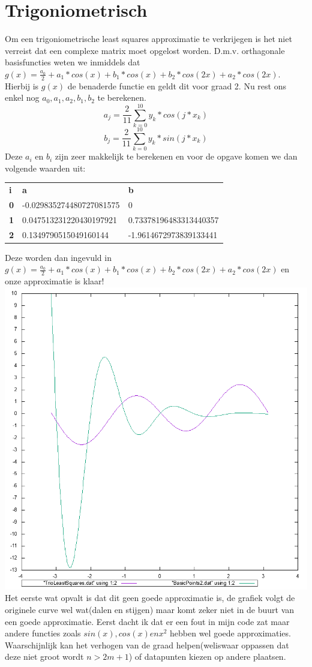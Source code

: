 \documentclass[10pt,a4paper]{article}
\begin{document}
\section{Trigoniometrisch}
Om een trigoniometrische least squares approximatie te verkrijegen is het niet verreist dat een complexe matrix moet opgelost worden. D.m.v. orthagonale basisfuncties weten we inmiddels dat $g(x) = \frac{a_{0}}{2}+a_{1}*cos(x)+b_{1}*cos(x)+b_{2}*cos(2x)+a_{2}*cos(2x)$. Hierbij is $g(x)$ de benaderde functie en geldt dit voor graad 2. Nu rest ons enkel nog $a_{0}, a_{1}, a_{2}, b_{1}, b_{2}$ te berekenen.
$$a_{j} =  \frac{2}{11}\sum_{k = 0}^{10}y_{k}*cos(j*x_{k})$$
$$b_{j} =  \frac{2}{11}\sum_{k = 0}^{10}y_{k}*sin(j*x_{k})$$
Deze $a_{i}$ en $b_{i}$ zijn zeer makkelijk te berekenen en voor de opgave komen we dan volgende waarden uit:
\newline
\begin{tabular}{lll}
\textbf{i} & \textbf{a}               & \textbf{b}             \\
\textbf{0} & -0.029835274480727081575 & 0                      \\
\textbf{1} & 0.047513231220430197921  & 0.73378196483313440357 \\
\textbf{2} & 0.1349790515049160144    & -1.9614672973839133441
\end{tabular}
Deze worden dan ingevuld in $g(x) = \frac{a_{0}}{2}+a_{1}*cos(x)+b_{1}*cos(x)+b_{2}*cos(2x)+a_{2}*cos(2x)$ en onze approximatie is klaar!
\newline
\includegraphics[scale=0.7]{TrioLeastSquares}
Het eerste wat opvalt is dat dit geen goede approximatie is, de grafiek volgt de originele curve wel wat(dalen en stijgen) maar komt zeker niet in de buurt van een goede approximatie. Eerst dacht ik dat er een fout in mijn code zat maar andere functies zoals $sin(x), cos(x) en x^{2}$ hebben wel goede approximaties. Waarschijnlijk kan het verhogen van de graad helpen(weliswaar oppassen dat deze niet groot wordt $n > 2m+1$) of datapunten kiezen op andere plaatsen.
\end{document}
